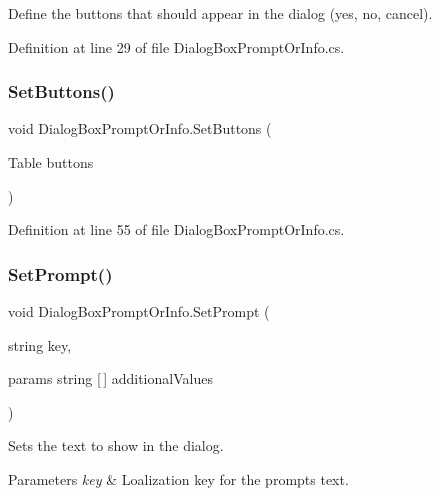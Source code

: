 Define the buttons that should appear in the dialog (yes, no, cancel). 



Definition at line 29 of file Dialog\+Box\+Prompt\+Or\+Info.\+cs.

\mbox{\label{class_dialog_box_prompt_or_info_ae28253797d0c08cdebb1e61782861766}} 
\subsubsection{\texorpdfstring{Set\+Buttons()}{SetButtons()}\hspace{0.1cm}{\footnotesize\ttfamily [2/2]}}
{\footnotesize\ttfamily void Dialog\+Box\+Prompt\+Or\+Info.\+Set\+Buttons (\begin{DoxyParamCaption}\item[{Table}]{buttons }\end{DoxyParamCaption})}



Definition at line 55 of file Dialog\+Box\+Prompt\+Or\+Info.\+cs.

\mbox{\label{class_dialog_box_prompt_or_info_a0073f1ea17e3a1fa1aa4735082d29034}} 
\subsubsection{\texorpdfstring{Set\+Prompt()}{SetPrompt()}}
{\footnotesize\ttfamily void Dialog\+Box\+Prompt\+Or\+Info.\+Set\+Prompt (\begin{DoxyParamCaption}\item[{string}]{key,  }\item[{params string \mbox{[}$\,$\mbox{]}}]{additional\+Values }\end{DoxyParamCaption})}



Sets the text to show in the dialog. 


\begin{DoxyParams}{Parameters}
{\em key} & Loalization key for the prompt\textquotesingle{}s text.\\
\hline
\end{DoxyParams}


